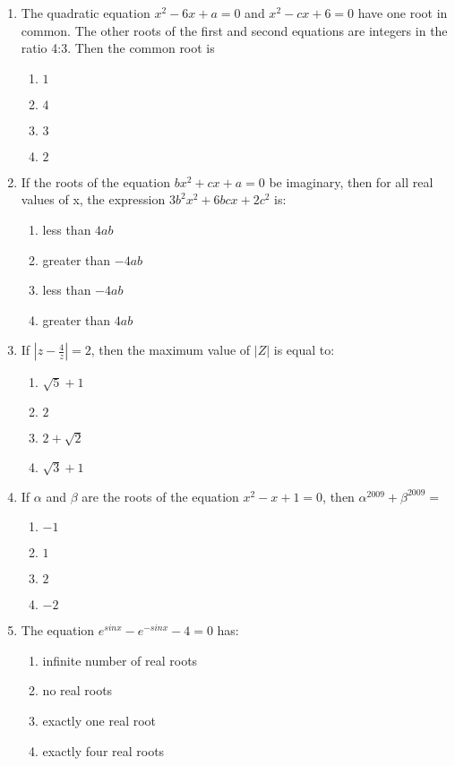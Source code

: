 \begin{enumerate}[label=\arabic*.,ref=\thesubsection.\theenumi]
\item The quadratic equation $x^2-6x+a=0$ and $x^2-cx+6=0$ have one root in common. The other roots of the first and second equations are integers in the ratio 4:3. Then the common root is
\begin{enumerate}
\item $1$
\item $4$
\item $3$
\item $2$ 
\end{enumerate}

\item If the roots of the equation $bx^2+cx+a=0$ be imaginary, then for all real values of x, the expression $3b^2x^2+6bcx+2c^2$ is:
\begin{enumerate}
\item less than $4ab$
\item greater than $-4ab$
\item less than $-4ab$
\item greater than $4ab$
\end{enumerate}

\item If $|z-\frac{4}{z}|=2$, then the maximum value of $|Z|$ is equal to: 
\begin{enumerate}
\item $\sqrt{5}+1$
\item $2$
\item $2+\sqrt{2}$
\item $\sqrt{3}+1$ 
\end{enumerate}

\item If $\alpha$ and $\beta$ are the roots of the equation $x^2-x+1=0$, then $\alpha^{2009}+\beta^{2009}=$
\begin{enumerate}
\item $-1$
\item $1$
\item $2$
\item $-2$ 
\end{enumerate}

\item The equation $e^{sinx}-e^{-sinx}-4=0$ has:
\begin{enumerate}
\item infinite number of real roots
\item no real roots
\item exactly one real root
\item exactly four real roots
\end{enumerate}


\end{enumerate}
